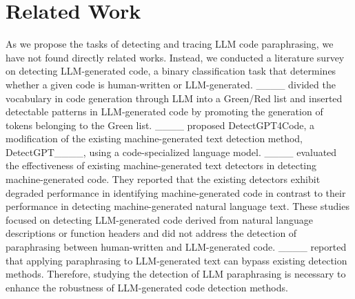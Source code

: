 \section{Related Work}
As we propose the tasks of detecting and tracing LLM code paraphrasing, 
we have not found directly related works. 
Instead, we conducted a literature survey on detecting LLM-generated code, 
a binary classification task that determines whether a given code is human-written or 
LLM-generated.
____ divided the vocabulary in code generation through LLM 
into a Green/Red list and inserted detectable patterns in LLM-generated code by 
promoting the generation of tokens belonging to the Green list.
____ proposed DetectGPT4Code, a modification of the existing 
machine-generated text detection method, 
DetectGPT____, using a code-specialized language model. 
____ evaluated the effectiveness of existing 
machine-generated text detectors in detecting machine-generated code.
They reported that the existing detectors exhibit degraded performance 
in identifying machine-generated code in contrast to 
their performance in detecting machine-generated natural language text.
These studies focused on detecting LLM-generated code derived from 
natural language descriptions 
or function headers and did not address the detection of paraphrasing between 
human-written and LLM-generated code.
____ reported that applying paraphrasing to 
LLM-generated text can bypass existing detection methods. 
Therefore, studying the detection of LLM paraphrasing
is necessary to enhance the robustness of LLM-generated code detection methods.